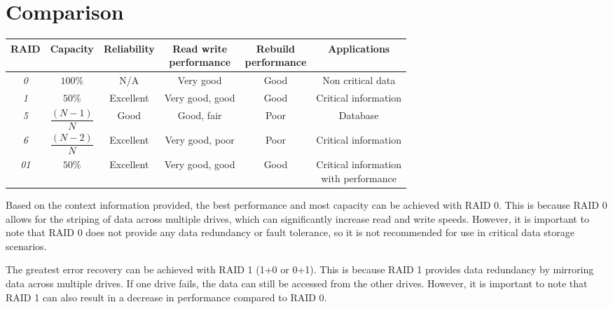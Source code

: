 \section{Comparison}
\begin{table}[H]
    \centering
    \begin{tabular}{|c|ccccc|}
    \hline
    \textbf{RAID} & \textbf{Capacity} & \textbf{Reliability} & \makecell{\textbf{Read write} \\\textbf{performance}} & \makecell{\textbf{Rebuild} \\\textbf{performance}} & \textbf{Applications}                 \\ \hline
    \textit{0}    & $100\%$           & N/A                  & Very good                       & Good                         & Non critical data                     \\
    \textit{1}    & $50\%$            & Excellent            & Very good, good                 & Good                         & Critical information                  \\
    \textit{5}    & $\dfrac{\left(N-1\right)}{N}$   & Good                 & Good, fair                      & Poor                         & Database                              \\
    \textit{6}    & $\dfrac{\left(N-2\right)}{N}$   & Excellent            & Very good, poor                 & Poor                         & Critical information                  \\
    \textit{01}   & $50\%$            & Excellent            & Very good, good                 & Good                         & \makecell{Critical information \\ with performance} \\ \hline
    \end{tabular}
\end{table}
Based on the context information provided, the best performance and most capacity can be achieved with RAID 0. 
This is because RAID 0 allows for the striping of data across multiple drives, which can significantly increase read and write speeds. 
However, it is important to note that RAID 0 does not provide any data redundancy or fault tolerance, so it is not recommended for use in critical data storage scenarios.

The greatest error recovery can be achieved with RAID 1 (1+0 or 0+1). This is because RAID 1 provides data redundancy by mirroring data across multiple drives. 
If one drive fails, the data can still be accessed from the other drives. 
However, it is important to note that RAID 1 can also result in a decrease in performance compared to RAID 0.

